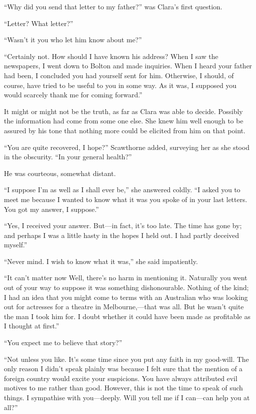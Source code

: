 ``Why did you send that letter to my father?'' was Clara's first
question.

``Letter? What letter?''

``Wasn't it you who let him know about me?''

{}``Certainly not. How should I have known his address? When I saw the
newspapers, I went down to Bolton and made inquiries. When I heard your
father had been, I concluded you had yourself sent for him. Otherwise, I
should, of course, have tried to be useful to you in some way. As it
was, I supposed you would scarcely thank me for coming forward.''

It might or might not be the truth, as far as Clara was able to decide.
Possibly the information had come from some one else. She knew him well
enough to be assured by his tone that nothing more could be elicited
from him on that point.

``You are quite recovered, I hope?'' Scawthorne added, surveying her as
she stood in the obscurity. ``In your general health?''

He was courteous, somewhat distant.

``I suppose I'm as well as I shall ever be,'' she answered coldly. ``I
asked you to meet me because I wanted to know what it was you spoke of
in your last letters. You got my answer, I suppose.''

``Yes, I received your answer. But---in fact, it's too late. The time
has gone by; and {}perhaps I was a little hasty in the hopes I held out.
I had partly deceived myself.''

``Never mind. I wish to know what it was,'' she said impatiently.

``It can't matter now Well, there's no harm in mentioning it. Naturally
you went out of your way to suppose it was something dishonourable.
Nothing of the kind; I had an idea that you might come to terms with an
Australian who was looking out for actresses for a theatre in
Melbourne,---that was all. But he wasn't quite the man I took him for. I
doubt whether it could have been made as profitable as I thought at
first.''

``You expect me to believe that story?''

``Not unless you like. It's some time since you put any faith in my
good-will. The only reason I didn't speak plainly was because I felt
sure that the mention of a foreign country would excite your suspicions.
You have always attributed evil motives to me rather than good. However,
this is not the time to speak of such things. I sympathise with
you---deeply. Will you tell me if I can---can help you at all?''

